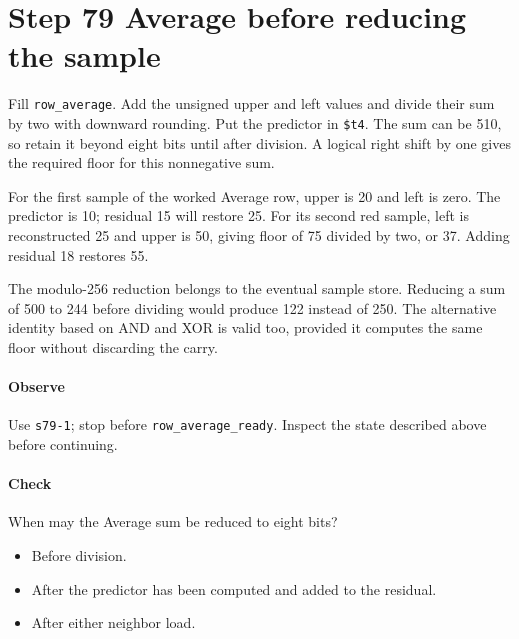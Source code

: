 \section{Step 79 Average before reducing the sample}
Fill \texttt{row\_average}. Add the unsigned upper and left values and divide their sum by two with downward rounding. Put the predictor in \texttt{\$t4}. The sum can be 510, so retain it beyond eight bits until after division. A logical right shift by one gives the required floor for this nonnegative sum.

For the first sample of the worked Average row, upper is 20 and left is zero. The predictor is 10; residual 15 will restore 25. For its second red sample, left is reconstructed 25 and upper is 50, giving floor of 75 divided by two, or 37. Adding residual 18 restores 55.

The modulo-256 reduction belongs to the eventual sample store. Reducing a sum of 500 to 244 before dividing would produce 122 instead of 250. The alternative identity based on AND and XOR is valid too, provided it computes the same floor without discarding the carry.

\paragraph{Observe} Use \texttt{s79-1}; stop before \texttt{row\_average\_ready}. Inspect the state described above before continuing.

\paragraph{Check} When may the Average sum be reduced to eight bits?
\begin{itemize}
  \item[A.] Before division.
  \item[B.] After the predictor has been computed and added to the residual.
  \item[C.] After either neighbor load.
\end{itemize}
